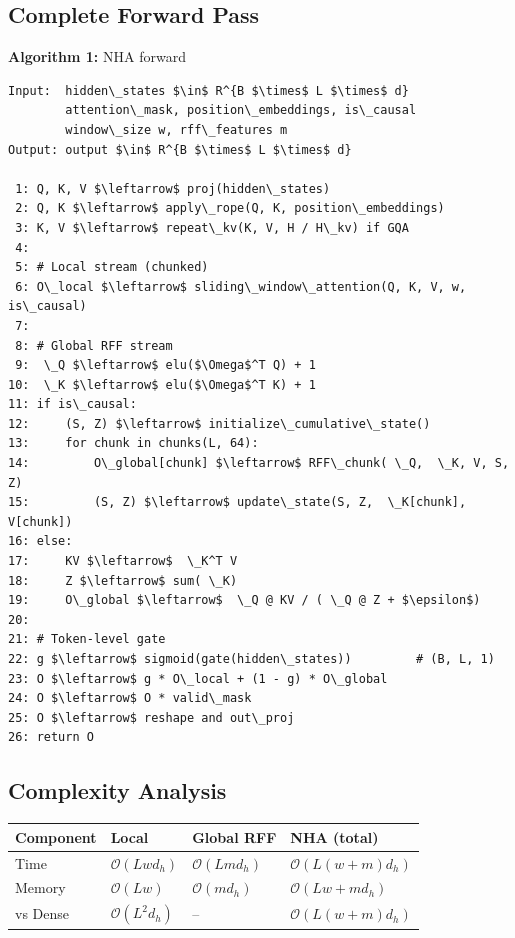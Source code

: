 \subsection{Complete Forward Pass}

\textbf{Algorithm 1:} NHA forward
\begin{lstlisting}
Input:  hidden\_states $\in$ R^{B $\times$ L $\times$ d}
        attention\_mask, position\_embeddings, is\_causal
        window\_size w, rff\_features m
Output: output $\in$ R^{B $\times$ L $\times$ d}

 1: Q, K, V $\leftarrow$ proj(hidden\_states)
 2: Q, K $\leftarrow$ apply\_rope(Q, K, position\_embeddings)
 3: K, V $\leftarrow$ repeat\_kv(K, V, H / H\_kv) if GQA
 4:
 5: # Local stream (chunked)
 6: O\_local $\leftarrow$ sliding\_window\_attention(Q, K, V, w, is\_causal)
 7:
 8: # Global RFF stream
 9:  \_Q $\leftarrow$ elu($\Omega$^T Q) + 1
10:  \_K $\leftarrow$ elu($\Omega$^T K) + 1
11: if is\_causal:
12:     (S, Z) $\leftarrow$ initialize\_cumulative\_state()
13:     for chunk in chunks(L, 64):
14:         O\_global[chunk] $\leftarrow$ RFF\_chunk( \_Q,  \_K, V, S, Z)
15:         (S, Z) $\leftarrow$ update\_state(S, Z,  \_K[chunk], V[chunk])
16: else:
17:     KV $\leftarrow$  \_K^T V
18:     Z $\leftarrow$ sum( \_K)
19:     O\_global $\leftarrow$  \_Q @ KV / ( \_Q @ Z + $\epsilon$)
20:
21: # Token-level gate
22: g $\leftarrow$ sigmoid(gate(hidden\_states))         # (B, L, 1)
23: O $\leftarrow$ g * O\_local + (1 - g) * O\_global
24: O $\leftarrow$ O * valid\_mask
25: O $\leftarrow$ reshape and out\_proj
26: return O
\end{lstlisting}

\subsection{Complexity Analysis}

\begin{table}[H]
\centering
\small
\begin{tabular}{llll}
\toprule
\textbf{Component} & \textbf{Local} & \textbf{Global RFF} & \textbf{NHA (total)} \\
\midrule
Time & $\mathcal{O}(L w d_h)$ & $\mathcal{O}(L m d_h)$ & $\mathcal{O}(L (w + m) d_h)$ \\
Memory & $\mathcal{O}(L w)$ & $\mathcal{O}(m d_h)$ & $\mathcal{O}(L w + m d_h)$ \\
vs Dense & $\mathcal{O}(L^2 d_h)$ & -- & \textbf{$\mathcal{O}(L (w + m) d_h)$} \\
\bottomrule
\end{tabular}
\end{table}

